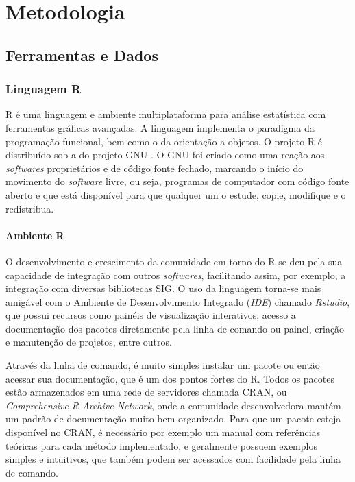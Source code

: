\chapter{Metodologia}\label{metodologia}

\section{Ferramentas e Dados}\label{ferramentas-e-dados}

\subsection{Linguagem R}\label{linguagem-r}

R é uma linguagem e ambiente multiplataforma para análise estatística
com ferramentas gráficas avançadas. A linguagem implementa o paradigma
da programação funcional, bem como o da orientação a objetos. O projeto
R é distribuído sob a  do projeto GNU \cite{rlang}. O GNU foi criado como uma reação aos \emph{softwares} proprietários
e de código fonte fechado, marcando o início do movimento do
\emph{software} livre, ou seja, programas de computador com código fonte
aberto e que está disponível para que qualquer um o estude, copie,
modifique e o redistribua\cite{torres2013tecnoutopia}.

\subsubsection{Ambiente R}\label{ambiente-r}

O desenvolvimento e crescimento da comunidade em torno do R se deu
pela sua capacidade de integração com outros \emph{softwares},
facilitando assim, por exemplo, a integração com diversas bibliotecas
SIG. O uso da linguagem torna-se mais amigável com o Ambiente de
Desenvolvimento Integrado (\emph{IDE}) chamado \emph{Rstudio}, que
possui recursos como painéis de visualização interativos, acesso a
documentação dos pacotes diretamente pela linha de comando ou painel,
criação e manutenção de projetos, entre outros. \cite{geocompr}

Através da linha de comando, é muito simples instalar um pacote ou
então acessar sua documentação, que é um dos pontos fortes do R. Todos
os pacotes estão armazenados em uma rede de servidores chamada CRAN, ou
\emph{Comprehensive R Archive Network}, onde a comunidade desenvolvedora
mantém um padrão de documentação muito bem organizado. Para que um
pacote esteja disponível no CRAN, é necessário por exemplo um manual com
referências teóricas para cada método implementado, e geralmente possuem
exemplos simples e intuitivos, que também podem ser acessados com
facilidade pela linha de comando.

